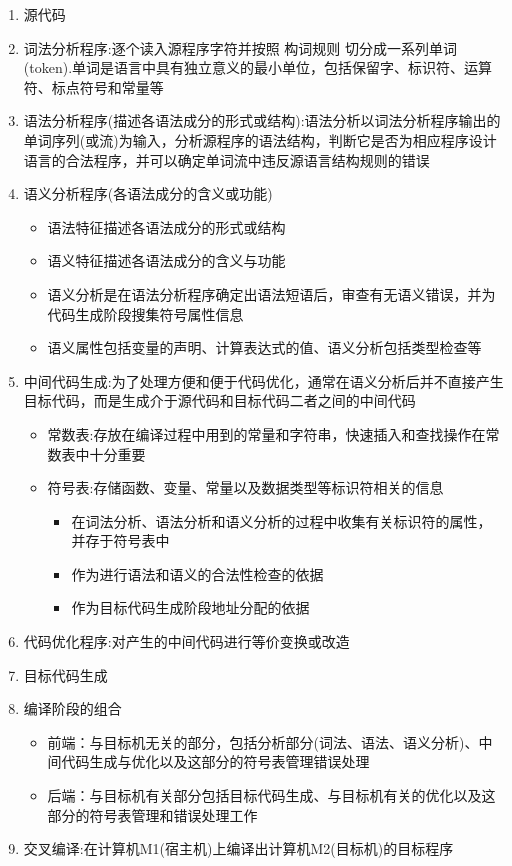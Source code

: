 \documentclass[utf8]{ctexart}
\begin{document}
\begin{enumerate}
    \item 源代码
    \item 词法分析程序:逐个读入源程序字符并按照 构词规则 切分成一系列单词(token).单词是语言中具有独立意义的最小单位，包括保留字、标识符、运算符、标点符号和常量等
    \item 语法分析程序(描述各语法成分的形式或结构):语法分析以词法分析程序输出的单词序列(或流)为输入，分析源程序的语法结构，判断它是否为相应程序设计语言的合法程序，并可以确定单词流中违反源语言结构规则的错误
    \item 语义分析程序(各语法成分的含义或功能)
    \begin{itemize}
        \item 语法特征描述各语法成分的形式或结构
        \item 语义特征描述各语法成分的含义与功能
        \item 语义分析是在语法分析程序确定出语法短语后，审查有无语义错误，并为代码生成阶段搜集符号属性信息
        \item 语义属性包括变量的声明、计算表达式的值、语义分析包括类型检查等
    \end{itemize}
    \item 中间代码生成:为了处理方便和便于代码优化，通常在语义分析后并不直接产生目标代码，而是生成介于源代码和目标代码二者之间的中间代码
    \begin{itemize}
        \item 常数表:存放在编译过程中用到的常量和字符串，快速插入和查找操作在常数表中十分重要
        \item 符号表:存储函数、变量、常量以及数据类型等标识符相关的信息
        \begin{itemize}
            \item 在词法分析、语法分析和语义分析的过程中收集有关标识符的属性，并存于符号表中
            \item 作为进行语法和语义的合法性检查的依据
            \item 作为目标代码生成阶段地址分配的依据
        \end{itemize}
    \end{itemize}
    \item 代码优化程序:对产生的中间代码进行等价变换或改造
    \item 目标代码生成
    \item 编译阶段的组合
    \begin{itemize}
        \item 前端：与目标机无关的部分，包括分析部分(词法、语法、语义分析)、中间代码生成与优化以及这部分的符号表管理错误处理
        \item 后端：与目标机有关部分包括目标代码生成、与目标机有关的优化以及这部分的符号表管理和错误处理工作
    \end{itemize}

    \item 交叉编译:在计算机M1(宿主机)上编译出计算机M2(目标机)的目标程序
\end{enumerate}
\end{document}
